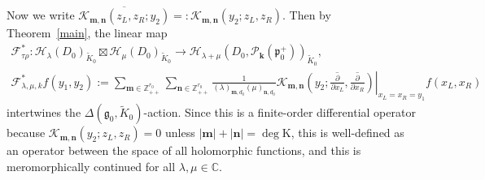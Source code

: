 \documentclass[pdftex]{sigma}
\numberwithin{equation}{section}
\newcommand{\bk}{\mathbf{k}}
\newcommand{\bm}{\mathbf{m}}
\newcommand{\bn}{\mathbf{n}}
\newcommand{\BZ}{\mathbb{Z}}
\newcommand{\BC}{\mathbb{C}}
\newcommand{\fg}{\mathfrak{g}}
\newcommand{\fp}{\mathfrak{p}}
\newcommand{\cF}{\mathcal{F}}
\newcommand{\cH}{\mathcal{H}}
\newcommand{\cK}{\mathcal{K}}
\newcommand{\cP}{\mathcal{P}}
\newcommand{\rK}{\mathrm{K}}
\begin{document}
Now we write $\overline{\cK_{\bm,\bn}(z_L,z_R;y_2)}=:\cK_{\bm,\bn}(y_2;z_L,z_R)$. Then by Theorem~\ref{main}, the linear map
\begin{gather*}
\cF_{\tau\rho}^*\colon \cH_\lambda(D_0)_{\tilde{K}_0}\boxtimes\cH_\mu(D_0)_{\tilde{K}_0}\to \cH_{\lambda+\mu}(D_0,\cP_\bk(\fp^+_0))_{\tilde{K}_0}, \\
\cF_{\lambda,\mu,k}^*f(y_1,y_2)
:=\sum_{\bm\in\BZ_{++}^{r_0}}\sum_{\bn\in\BZ_{++}^{r_0}}\frac{1}{(\lambda)_{\bm,d_0}(\mu)_{\bn,d_0}}
\cK_{\bm,\bn}\left.\left(y_2;\overline{\frac{\partial}{\partial x_L}},\overline{\frac{\partial}{\partial x_R}}\right)
\right|_{x_L=x_R=y_1} f(x_L,x_R)
\end{gather*}
intertwines the $\Delta(\fg_0,\tilde{K}_0)$-action.
Since this is a finite-order differential operator because \linebreak $\cK_{\bm,\bn}(y_2;z_L,z_R)=0$ unless $|\bm|+|\bn|=\deg \rK$,
this is well-defined as an operator between the space of all holomorphic functions,
and this is meromorphically continued for all $\lambda,\mu\in\BC$.
\end{document}
